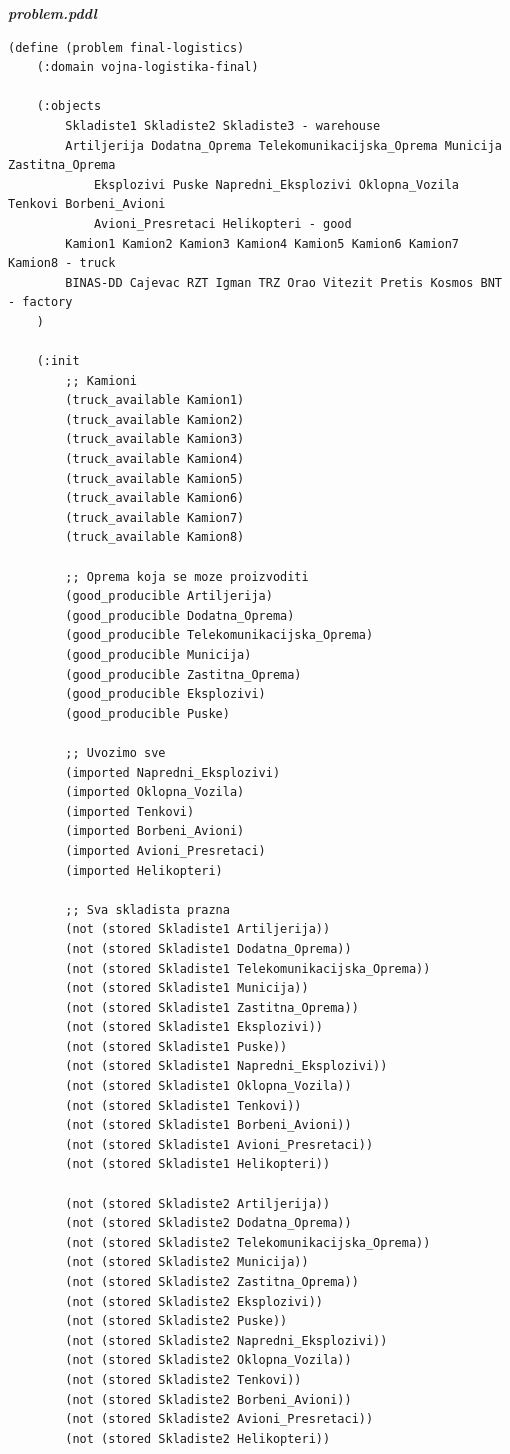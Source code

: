 \documentclass{article}
\begin{document}
\noindent
\textbf{\textit{problem.pddl}}
\begin{verbatim}
(define (problem final-logistics)
    (:domain vojna-logistika-final)

    (:objects
        Skladiste1 Skladiste2 Skladiste3 - warehouse
        Artiljerija Dodatna_Oprema Telekomunikacijska_Oprema Municija Zastitna_Oprema 
            Eksplozivi Puske Napredni_Eksplozivi Oklopna_Vozila Tenkovi Borbeni_Avioni 
            Avioni_Presretaci Helikopteri - good
        Kamion1 Kamion2 Kamion3 Kamion4 Kamion5 Kamion6 Kamion7 Kamion8 - truck
        BINAS-DD Cajevac RZT Igman TRZ Orao Vitezit Pretis Kosmos BNT - factory
    )

    (:init
        ;; Kamioni
        (truck_available Kamion1)
        (truck_available Kamion2)
        (truck_available Kamion3)
        (truck_available Kamion4)
        (truck_available Kamion5)
        (truck_available Kamion6)
        (truck_available Kamion7)
        (truck_available Kamion8)

        ;; Oprema koja se moze proizvoditi
        (good_producible Artiljerija)
        (good_producible Dodatna_Oprema)
        (good_producible Telekomunikacijska_Oprema)
        (good_producible Municija)
        (good_producible Zastitna_Oprema)
        (good_producible Eksplozivi)
        (good_producible Puske)

        ;; Uvozimo sve
        (imported Napredni_Eksplozivi)
        (imported Oklopna_Vozila)
        (imported Tenkovi)
        (imported Borbeni_Avioni)
        (imported Avioni_Presretaci)
        (imported Helikopteri)

        ;; Sva skladista prazna
        (not (stored Skladiste1 Artiljerija))
        (not (stored Skladiste1 Dodatna_Oprema))
        (not (stored Skladiste1 Telekomunikacijska_Oprema))
        (not (stored Skladiste1 Municija))
        (not (stored Skladiste1 Zastitna_Oprema))
        (not (stored Skladiste1 Eksplozivi))
        (not (stored Skladiste1 Puske))
        (not (stored Skladiste1 Napredni_Eksplozivi))
        (not (stored Skladiste1 Oklopna_Vozila))
        (not (stored Skladiste1 Tenkovi))
        (not (stored Skladiste1 Borbeni_Avioni))
        (not (stored Skladiste1 Avioni_Presretaci))
        (not (stored Skladiste1 Helikopteri))

        (not (stored Skladiste2 Artiljerija))
        (not (stored Skladiste2 Dodatna_Oprema))
        (not (stored Skladiste2 Telekomunikacijska_Oprema))
        (not (stored Skladiste2 Municija))
        (not (stored Skladiste2 Zastitna_Oprema))
        (not (stored Skladiste2 Eksplozivi))
        (not (stored Skladiste2 Puske))
        (not (stored Skladiste2 Napredni_Eksplozivi))
        (not (stored Skladiste2 Oklopna_Vozila))
        (not (stored Skladiste2 Tenkovi))
        (not (stored Skladiste2 Borbeni_Avioni))
        (not (stored Skladiste2 Avioni_Presretaci))
        (not (stored Skladiste2 Helikopteri))


\end{verbatim}
\end{document}
